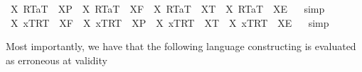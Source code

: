 \begin{isabellebody}
%
\endisadelimproof
%
\isamarkuptrue%
\isamarkupfalse%
\ {\isachardoublequoteopen}{\isasymexists}X{\isachardot}\ {\isasymlparr}R\isactrlsup T{\isacharcomma}a\isactrlsup T{\isasymrparr}\ {\isacharequal}\ {\isacharparenleft}X\isactrlsup P{\isacharparenright}\ {\isasymand}\ {\isasymnot}{\isacharparenleft}{\isasymexists}X{\isachardot}\ {\isasymlparr}R\isactrlsup T{\isacharcomma}a\isactrlsup T{\isasymrparr}\ {\isacharequal}\ {\isacharparenleft}X\isactrlsup F{\isacharparenright}{\isacharparenright}\ {\isasymand}\ {\isasymnot}{\isacharparenleft}{\isasymexists}X{\isachardot}\ {\isasymlparr}R\isactrlsup T{\isacharcomma}a\isactrlsup T{\isasymrparr}\ {\isacharequal}\ {\isacharparenleft}X\isactrlsup T{\isacharparenright}{\isacharparenright}\ {\isasymand}\ {\isasymnot}{\isacharparenleft}{\isasymexists}X{\isachardot}\ {\isasymlparr}R\isactrlsup T{\isacharcomma}a\isactrlsup T{\isasymrparr}\ {\isacharequal}\ {\isacharparenleft}X\isactrlsup E{\isacharparenright}{\isacharparenright}{\isachardoublequoteclose}%
\isadelimproof
\ %
\endisadelimproof
%
\isatagproof
{}\isamarkupfalse%
\ simp\ \isamarkupfalse%
%
\endisatagproof
{\isafoldproof}%
%
\isadelimproof
%
\endisadelimproof
\isanewline
{}\isamarkupfalse%
\ {\isachardoublequoteopen}{\isasymexists}X{\isachardot}\ {\isasymlbrace}x\isactrlsup T{\isacharcomma}R\isactrlsup T{\isasymrbrace}\ {\isacharequal}\ {\isacharparenleft}X\isactrlsup F{\isacharparenright}\ {\isasymand}\ {\isasymnot}{\isacharparenleft}{\isasymexists}X{\isachardot}\ {\isasymlbrace}x\isactrlsup T{\isacharcomma}R\isactrlsup T{\isasymrbrace}\ {\isacharequal}\ {\isacharparenleft}X\isactrlsup P{\isacharparenright}{\isacharparenright}\ {\isasymand}\ {\isasymnot}{\isacharparenleft}{\isasymexists}X{\isachardot}\ {\isasymlbrace}x\isactrlsup T{\isacharcomma}R\isactrlsup T{\isasymrbrace}\ {\isacharequal}\ {\isacharparenleft}X\isactrlsup T{\isacharparenright}{\isacharparenright}\ {\isasymand}\ {\isasymnot}{\isacharparenleft}{\isasymexists}X{\isachardot}\ {\isasymlbrace}x\isactrlsup T{\isacharcomma}R\isactrlsup T{\isasymrbrace}\ {\isacharequal}\ {\isacharparenleft}X\isactrlsup E{\isacharparenright}{\isacharparenright}{\isachardoublequoteclose}%
\isadelimproof
\ %
\endisadelimproof
%
\isatagproof
{}\isamarkupfalse%
\ simp\ \isamarkupfalse%
%
\endisatagproof
{\isafoldproof}%
%
\isadelimproof
%
\endisadelimproof
%
\begin{isamarkuptext}%
Most importantly, we have that the following language constructing is evaluated as erroneous at validity

\end{isamarkuptext}
\end{isabellebody}
